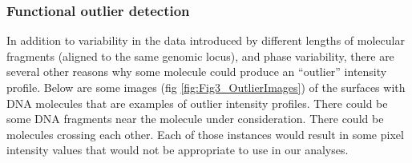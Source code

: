 \subsubsection*{Functional outlier detection} \label{ch3_outlier}
In addition to variability in the data introduced by different lengths of molecular fragments (aligned to the same genomic locus), and phase variability, there are several other reasons why some molecule could produce an ``outlier'' intensity profile. Below are some images (fig \ref{fig:Fig3_OutlierImages}) of the surfaces with DNA molecules that are examples of outlier intensity profiles. There could be some DNA fragments near the molecule under consideration. There could be molecules crossing each other. Each of those instances would result in some pixel intensity values that would not be appropriate to use in our analyses. 

